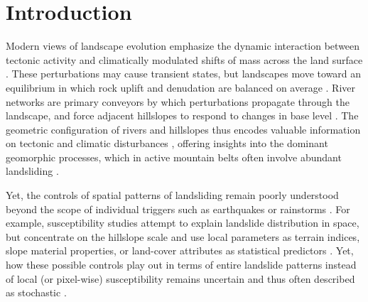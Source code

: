 \documentclass[draft]{agujournal2019}
\begin{document}
\section{Introduction}
\par Modern views of landscape evolution emphasize the dynamic interaction between tectonic activity and climatically modulated shifts of mass across the land surface \cite{Davies2021, Whittaker2012, Irasema2002}. These perturbations may cause transient states, but landscapes move toward an equilibrium in which rock uplift and denudation are balanced on average \cite{Whittaker2012, Wobus2006, Whipple2004}. River networks are primary conveyors by which perturbations propagate through the landscape, and force adjacent hillslopes to respond to changes in base level \cite{Whipple2004, howard1994}. The geometric configuration of rivers and hillslopes thus encodes valuable information on tectonic and climatic disturbances \cite{whipple2017, stock1999}, offering insights into the dominant geomorphic processes, which in active mountain belts often involve abundant landsliding \cite{Larsen2012, korup2010, Montgomery2002, Campforts2020, Broeckx2020}.

\par Yet, the controls of spatial patterns of landsliding remain poorly understood beyond the scope of individual triggers such as earthquakes or rainstorms \cite{yanites2018}. For example, susceptibility studies attempt to explain landslide distribution in space, but concentrate on the hillslope scale and use local parameters as terrain indices, slope material properties, or land-cover attributes as statistical predictors \cite{reichenbach2018, soeters1996, montgomery1994}. Yet, how these possible controls play out in terms of entire landslide patterns instead of local (or pixel-wise) susceptibility remains uncertain and thus often described as stochastic \cite{Benda1997}. 
\end{document}
